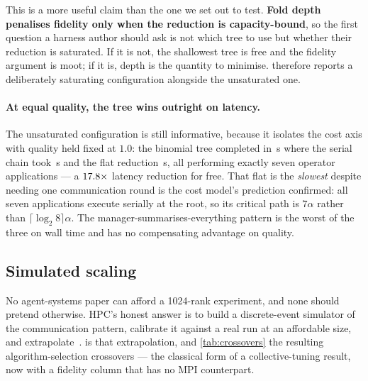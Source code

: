 \documentclass[10pt,twocolumn]{article}
\theoremstyle{definition}
\theoremstyle{plain}
\begin{document}
This is a more useful claim than the one we set out to test. \textbf{Fold depth
penalises fidelity only when the reduction is capacity-bound}, so the first question
a harness author should ask is not which tree to use but whether their reduction is
saturated. If it is not, the shallowest tree is free and the fidelity argument is
moot; if it is, depth is the quantity to minimise.  therefore
reports a deliberately saturating configuration alongside the unsaturated one.

\paragraph{At equal quality, the tree wins outright on latency.} The unsaturated
configuration is still informative, because it isolates the cost axis with quality
held fixed at $1.0$: the binomial tree completed in \NFidTree\,s where the serial
chain took \NFidChain\,s and the flat reduction \NFidFlat\,s, all performing exactly
seven operator applications --- a $17.8\times$ latency reduction for free.
That flat is the \emph{slowest} despite needing one communication round is the cost
model's prediction confirmed: all seven applications execute serially at the root, so
its critical path is $7\alpha$ rather than $\lceil\log_2 8\rceil\alpha$. The
manager-summarises-everything pattern is the worst of the three on wall time and has
no compensating advantage on quality.

\subsection{Simulated scaling}

\begin{table}[t]
\centering\scriptsize

\caption{Simulated collective makespan (seconds) with parameters calibrated from the
measured runs, median of 32 trials. Latency is drawn log-normally, because agent
latency is right-skewed and a collective's completion time is a maximum over ranks.}
\label{tab:scalingsim}
\end{table}

No agent-systems paper can afford a 1024-rank experiment, and none should pretend
otherwise. HPC's honest answer is to build a discrete-event simulator of the
communication pattern, calibrate it against a real run at an affordable size, and
extrapolate~\cite{Hoefler10loggopsim}.  is that
extrapolation, and \cref{tab:crossovers} the resulting algorithm-selection
crossovers --- the classical form of a collective-tuning result, now with a fidelity
column that has no MPI counterpart.
\end{document}
